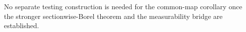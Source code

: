 No separate testing construction is needed for the common-map corollary once the stronger sectionwise-Borel theorem and the measurability bridge are established.